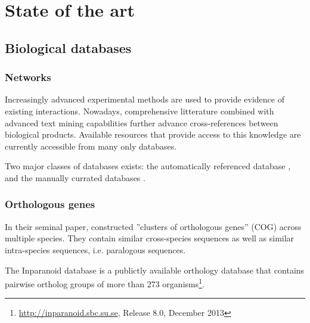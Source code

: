 \chapter{State of the art}
\label{chap:state}


\section{Biological databases}
	\subsection{Networks}

	Increasingly advanced experimental methods are used to provide evidence of existing interactions.
	Nowadays, comprehensive litterature combined with advanced text mining capabilities further advance cross-references between biological products.
	Available resources that provide access to this knowledge are currently accessible from many only databases.

	Two major classes of databases exists: the automatically referenced database \parencite{szklarczyk2014string}, and the manually currated databases \parencite{orchard2012protein}.

	\subsection{Orthologous genes}
%
	In their seminal paper, \parencite{tatusov1997genomic} constructed ''clusters of orthologous genes'' (COG) across multiple species.
	They contain similar cross-species sequences as well as similar intra-species sequences, i.e. paralogous sequences.

	The Inparanoid database \parencite{obrien2005inparanoid} is a publictly available orthology database that contains pairwise ortholog groups of more than 273 organisms\footnote{\url{http://inparanoid.sbc.su.se}, Release 8.0, December 2013}.



%
%
%
%

